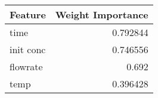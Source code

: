 \begin{longtable}{lr}
\hline
 Feature   &   Weight Importance \\
\hline
 time      &            0.792844 \\
 init conc &            0.746556 \\
 flowrate  &            0.692    \\
 temp      &            0.396428 \\
\hline
\end{longtable}
